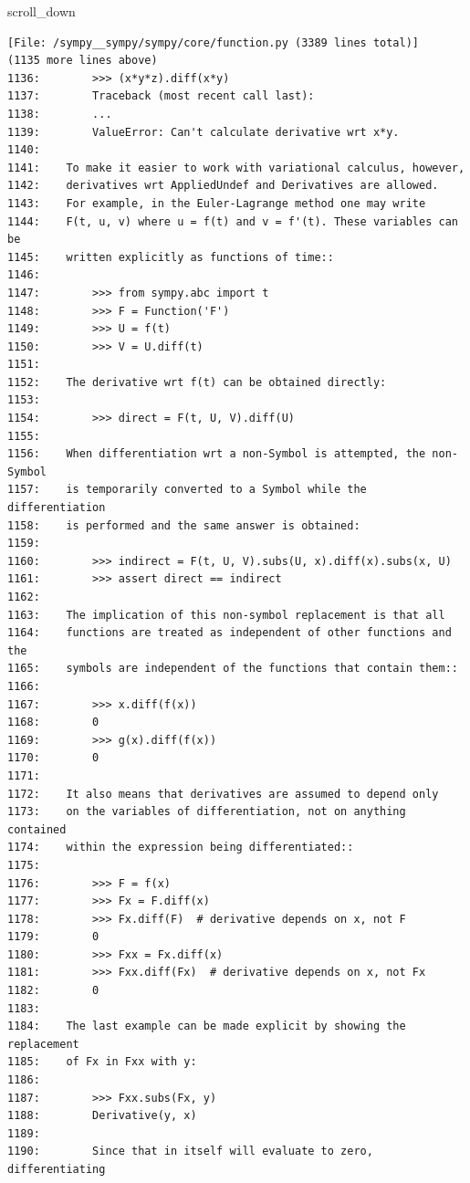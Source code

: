 {\begin{agentbox}
\hrulefill
\begin{CodeVerbatim}[breaklines=true, breakanywhere=true]
scroll_down
\end{CodeVerbatim}
\end{agentbox}
\begin{observationbox}\begin{Verbatim}[breaklines=true, breakanywhere=true]
[File: /sympy__sympy/sympy/core/function.py (3389 lines total)]
(1135 more lines above)
1136:        >>> (x*y*z).diff(x*y)
1137:        Traceback (most recent call last):
1138:        ...
1139:        ValueError: Can't calculate derivative wrt x*y.
1140:
1141:    To make it easier to work with variational calculus, however,
1142:    derivatives wrt AppliedUndef and Derivatives are allowed.
1143:    For example, in the Euler-Lagrange method one may write
1144:    F(t, u, v) where u = f(t) and v = f'(t). These variables can be
1145:    written explicitly as functions of time::
1146:
1147:        >>> from sympy.abc import t
1148:        >>> F = Function('F')
1149:        >>> U = f(t)
1150:        >>> V = U.diff(t)
1151:
1152:    The derivative wrt f(t) can be obtained directly:
1153:
1154:        >>> direct = F(t, U, V).diff(U)
1155:
1156:    When differentiation wrt a non-Symbol is attempted, the non-Symbol
1157:    is temporarily converted to a Symbol while the differentiation
1158:    is performed and the same answer is obtained:
1159:
1160:        >>> indirect = F(t, U, V).subs(U, x).diff(x).subs(x, U)
1161:        >>> assert direct == indirect
1162:
1163:    The implication of this non-symbol replacement is that all
1164:    functions are treated as independent of other functions and the
1165:    symbols are independent of the functions that contain them::
1166:
1167:        >>> x.diff(f(x))
1168:        0
1169:        >>> g(x).diff(f(x))
1170:        0
1171:
1172:    It also means that derivatives are assumed to depend only
1173:    on the variables of differentiation, not on anything contained
1174:    within the expression being differentiated::
1175:
1176:        >>> F = f(x)
1177:        >>> Fx = F.diff(x)
1178:        >>> Fx.diff(F)  # derivative depends on x, not F
1179:        0
1180:        >>> Fxx = Fx.diff(x)
1181:        >>> Fxx.diff(Fx)  # derivative depends on x, not Fx
1182:        0
1183:
1184:    The last example can be made explicit by showing the replacement
1185:    of Fx in Fxx with y:
1186:
1187:        >>> Fxx.subs(Fx, y)
1188:        Derivative(y, x)
1189:
1190:        Since that in itself will evaluate to zero, differentiating

\end{Verbatim}
\end{observationbox}}
